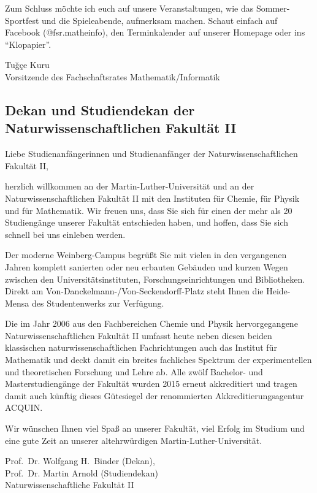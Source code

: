 Zum Schluss möchte ich euch 
auf unsere Veranstaltungen,
wie das Sommer-Sportfest und die Spieleabende,
aufmerksam machen.
Schaut einfach auf Facebook (@fsr.matheinfo),
den Terminkalender auf unserer Homepage
oder ins "`Klopapier"'.

Tuğçe Kuru \\
Vorsitzende des Fachschaftsrates Mathematik/Informatik


\subsection*{Dekan und Studiendekan der Naturwissenschaftlichen Fakultät II}

Liebe Studienanfängerinnen und Studienanfänger der Naturwissenschaftlichen
Fakultät II,

herzlich willkommen an der Martin-Luther-Universität und an der
Naturwissenschaftlichen Fakultät II mit den Instituten für Chemie, für Physik
und für Mathematik. Wir freuen uns, dass Sie sich für einen der mehr als 20
Studiengänge unserer Fakultät entschieden haben, und hoffen, dass Sie sich
schnell bei uns einleben werden.

Der moderne Weinberg-Campus begrüßt Sie mit vielen in den vergangenen Jahren
komplett sanierten oder neu erbauten Gebäuden und kurzen Wegen zwischen den
Universitätsinstituten, Forschungseinrichtungen und Bibliotheken. Direkt am
Von-Danckelmann-/Von-Seckendorff-Platz steht Ihnen die Heide-Mensa des
Studentenwerks zur Verfügung.

Die im Jahr 2006 aus den Fachbereichen Chemie und Physik hervorgegangene
Naturwissenschaftlichen Fakultät II umfasst heute neben diesen beiden
klassischen naturwissenschaftlichen Fachrichtungen auch das Institut für
Mathematik und deckt damit ein breites fachliches Spektrum der experimentellen
und theoretischen Forschung und Lehre ab. Alle zwölf Bachelor- und
Masterstudiengänge der Fakultät wurden 2015 erneut
akkreditiert und tragen damit auch künftig dieses Gütesiegel der renommierten
Akkreditierungsagentur ACQUIN.

Wir wünschen Ihnen viel Spaß an unserer Fakultät, viel Erfolg im Studium und
eine gute Zeit an unserer altehrwürdigen Martin-Luther-Universität.

Prof.~Dr. Wolfgang H.~Binder (Dekan), \\
Prof.~Dr. Martin Arnold (Studiendekan) \\
Naturwissenschaftliche Fakultät II 

\newpage

